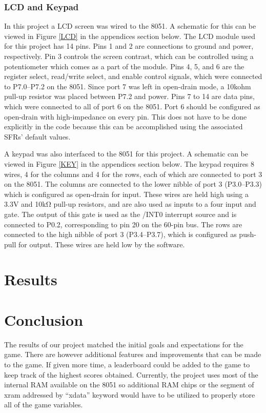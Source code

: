 \documentclass[12pt]{article}
\begin{document}
	\subsubsection{LCD and Keypad}
	In this project a LCD screen was wired to the 8051. A schematic for this can be viewed in Figure \ref{LCD} in the appendices section below. The LCD module used for this project has 14 pins.
	Pins 1 and 2 are connections to ground and power, respectively. Pin 3 controls the screen contrast, which can be controlled using a potentiometer which comes as a part of the module. Pins 4, 5, and 6 are the register select, read/write select, and enable control signals, which were connected to P7.0--P7.2 on the 8051. Since port 7 was left in open-drain mode, a 10k\si{ohm} pull-up resistor was placed between P7.2 and power. Pins 7 to 14 are data pins, which were connected to all of port 6 on the 8051. Port 6 should be configured as open-drain with high-impedance on every pin. This does not have to be done explicitly in the code because this can be accomplished using the associated SFRs' default values.
	
	A keypad was also interfaced to the 8051 for this project. A schematic can be viewed in Figure \ref{KEY} in the appendices section below. The keypad requires 8 wires, 4 for the columns and 4 for the rows, each of which are connected to port 3 on the 8051. The columns are connected to the lower nibble of port 3 (P3.0--P3.3) which is configured as open-drain for input. These wires are held high using a 3.3\si{V} and 10k\si{\ohm} pull-up resistors, and are also used as inputs to a four input and gate. The output of this gate is used as the /INT0 interrupt source and is connected to P0.2, corresponding to pin 20 on the 60-pin bus. The rows are connected to the high nibble of port 3 (P3.4--P3.7), which is configured as push-pull for output. These wires are held low by the software. 
	
	\section{Results}
	
	\section{Conclusion}
	The results of our project matched the initial goals and expectations for the game. There are however additional features and improvements that can be made to the game. If given more time, a leaderboard could be added to the game to keep track of the highest scores obtained. Currently, the project uses most of the internal RAM available on the 8051 so additional RAM chips or the segment of xram addressed by ``xdata'' keyword would have to be utilized to properly store all of the game variables.
	
\end{document}
